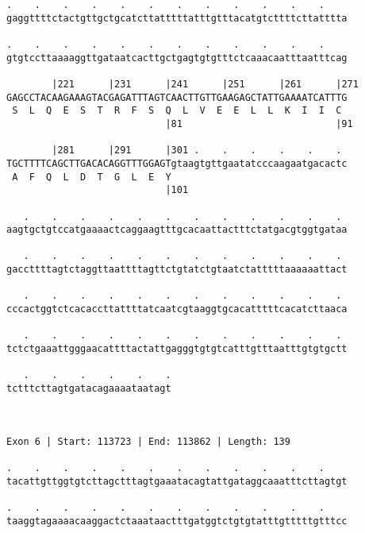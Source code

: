 \documentclass{article}
\begin{document}
\begin{Verbatim}
.    .    .    .    .    .    .    .    .    .    .    .    
gaggttttctactgttgctgcatcttatttttatttgtttacatgtcttttcttatttta
                                                            
.    .    .    .    .    .    .    .    .    .    .    .    
gtgtccttaaaaggttgataatcacttgctgagtgtgtttctcaaacaatttaatttcag
                                                            
        |221      |231      |241      |251      |261      |271
GAGCCTACAAGAAAGTACGAGATTTAGTCAACTTGTTGAAGAGCTATTGAAAATCATTTG
 S  L  Q  E  S  T  R  F  S  Q  L  V  E  E  L  L  K  I  I  C 
                            |81                           |91
  
        |281      |291      |301 .    .    .    .    .    . 
TGCTTTTCAGCTTGACACAGGTTTGGAGTgtaagtgttgaatatcccaagaatgacactc
 A  F  Q  L  D  T  G  L  E  Y                               
                            |101                            
  
   .    .    .    .    .    .    .    .    .    .    .    . 
aagtgctgtccatgaaaactcaggaagtttgcacaattactttctatgacgtggtgataa
                                                            
   .    .    .    .    .    .    .    .    .    .    .    . 
gaccttttagtctaggttaattttagttctgtatctgtaatctatttttaaaaaattact
                                                            
   .    .    .    .    .    .    .    .    .    .    .    . 
cccactggtctcacaccttattttatcaatcgtaaggtgcacatttttcacatcttaaca
                                                            
   .    .    .    .    .    .    .    .    .    .    .    . 
tctctgaaattgggaacattttactattgagggtgtgtcatttgtttaatttgtgtgctt
                                                            
   .    .    .    .    .    .
tctttcttagtgatacagaaaataatagt
                             
                             
 
Exon 6 | Start: 113723 | End: 113862 | Length: 139
 
.    .    .    .    .    .    .    .    .    .    .    .    
tacattgttggtgtcttagctttagtgaaatacagtattgataggcaaatttcttagtgt
                                                            
.    .    .    .    .    .    .    .    .    .    .    .    
taaggtagaaaacaaggactctaaataactttgatggtctgtgtatttgtttttgtttcc
                                                            

\end{Verbatim}
\end{document}

